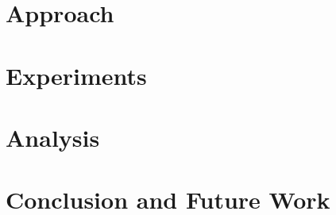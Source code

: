\documentclass[letterpaper,12pt,titlepage,oneside,final]{book}
\let\origdoublepage\cleardoublepage
\newcommand{\clearemptydoublepage}{%
  \clearpage{\pagestyle{empty}\origdoublepage}}
\let\cleardoublepage\clearemptydoublepage
\begin{document}


\chapter{Approach}



\chapter{Experiments}



\chapter{Analysis}



\chapter{Conclusion and Future Work}






\cleardoublepage %
\renewcommand*{\bibname}{References}
\end{document}
